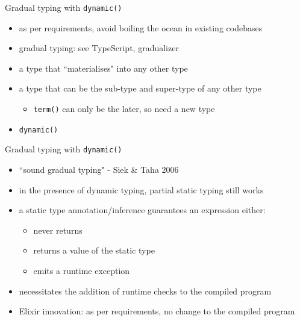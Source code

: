 \documentclass[
  ignorenonframetext,
  aspectratio=169]{beamer}
\newcommand{\passthrough}[1]{#1}
\providecommand{\tightlist}{%
  \setlength{\itemsep}{0pt}\setlength{\parskip}{0pt}}
\begin{document}
\begin{frame}[fragile]{Gradual typing with
\passthrough{\lstinline!dynamic()!}}
\label{gradual-typing-with-dynamic}
\begin{itemize}
\tightlist
\item
  as per requirements, avoid boiling the ocean in existing codebases
\item
  gradual typing: see TypeScript, gradualizer
\item
  a type that ``materialises" into any other type
\item
  a type that can be the sub-type and super-type of any other type

  \begin{itemize}
  \tightlist
  \item
    \passthrough{\lstinline!term()!} can only be the later, so need a
    new type
  \end{itemize}
\item
  \passthrough{\lstinline!dynamic()!}
\end{itemize}
\end{frame}

\begin{frame}{Gradual typing with \passthrough{\lstinline!dynamic()!}}
\label{gradual-typing-with-dynamic-1}
\begin{itemize}
\tightlist
\item
  ``sound gradual typing" - Siek \& Taha 2006
\item
  in the presence of dynamic typing, partial static typing still works
\item
  a static type annotation/inference guarantees an expression either:

  \begin{itemize}
  \tightlist
  \item
    never returns
  \item
    returns a value of the static type
  \item
    emits a runtime exception
  \end{itemize}
\item
  necessitates the addition of runtime checks to the compiled program
\item
  Elixir innovation: as per requirements, no change to the compiled
  program
\end{itemize}
\end{frame}
\end{document}
